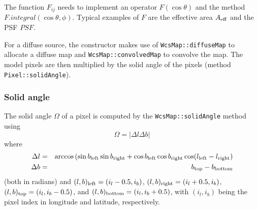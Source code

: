 \documentclass{article}[12pt,a4]
\begin{document}
The function $F_{ij}$ needs to implement an operator $F(\cos \theta)$ and the
method $F.integral(\cos \theta, \phi)$.
Typical examples of $F$ are the effective area $A_{\rm eff}$ and the PSF $PSF$.






For a diffuse source, the constructor makes use of
{\tt WcsMap::diffuseMap} to allocate a diffuse map and
{\tt WcsMap::convolvedMap} to convolve the map.
The model pixels are then multiplied by the solid angle of the pixels
(method {\tt Pixel::solidAngle}).


\subsubsection{Solid angle}

The solid angle $\Omega$ of a pixel is computed by the {\tt WcsMap::solidAngle} method
using
\begin{equation}
\Omega = | \Delta l \Delta b |
\end{equation}
where
\begin{eqnarray}
\Delta l & = & \arccos \left( \sin b_{\rm left} \sin b_{\rm right} + \cos b_{\rm left} \cos b_{\rm right}
                         \cos ( l_{\rm left} - l_{\rm right} \right) \\
\Delta b & = & b_{\rm top} - b_{\rm bottom}
\end{eqnarray}
(both in radians) and
$(l,b)_{\rm left} = (i_l-0.5,i_b)$,
$(l,b)_{\rm right} = (i_l+0.5,i_b)$,
$(l,b)_{\rm top} = (i_l,i_b-0.5)$, and
$(l,b)_{\rm bottom} = (i_l,i_b+0.5)$,
with $(i_l,i_b)$ being the pixel index in longitude and latitude, respectively.
\end{document}
